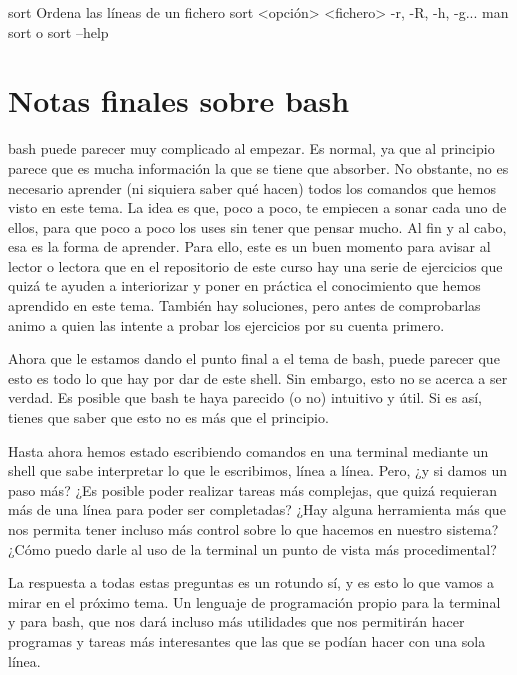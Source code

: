 \begin{command-info}
{sort}
{Ordena las líneas de un fichero}
{sort <opción> <fichero>}
{-r, -R, -h, -g...}
{man sort o sort --help}
\end{command-info}

\section{Notas finales sobre bash}
bash puede parecer muy complicado al empezar. Es normal, ya que al principio parece que es mucha información la que se tiene que absorber. No obstante, no es necesario aprender (ni siquiera saber qué hacen) todos los comandos que hemos visto en este tema. La idea es que, poco a poco, te empiecen a sonar cada uno de ellos, para que poco a poco los uses sin tener que pensar mucho. Al fin y al cabo, esa es la forma de aprender. Para ello, este es un buen momento para avisar al lector o lectora que en el repositorio de este curso hay una serie de ejercicios que quizá te ayuden a interiorizar y poner en práctica el conocimiento que hemos aprendido en este tema. También hay soluciones, pero antes de comprobarlas animo a quien las intente a probar los ejercicios por su cuenta primero.

Ahora que le estamos dando el punto final a el tema de bash, puede parecer que esto es todo lo que hay por dar de este shell. Sin embargo, esto no se acerca a ser verdad. Es posible que bash te haya parecido (o no) intuitivo y útil. Si es así, tienes que saber que esto no es más que el principio.

Hasta ahora hemos estado escribiendo comandos en una terminal mediante un shell que sabe interpretar lo que le escribimos, línea a línea. Pero, ¿y si damos un paso más? ¿Es posible poder realizar tareas más complejas, que quizá requieran más de una línea para poder ser completadas? ¿Hay alguna herramienta más que nos permita tener incluso más control sobre lo que hacemos en nuestro sistema? ¿Cómo puedo darle al uso de la terminal un punto de vista más procedimental?

La respuesta a todas estas preguntas es un rotundo sí, y es esto lo que vamos a mirar en el próximo tema. Un lenguaje de programación propio para la terminal y para bash, que nos dará incluso más utilidades que nos permitirán hacer programas y tareas más interesantes que las que se podían hacer con una sola línea. 

